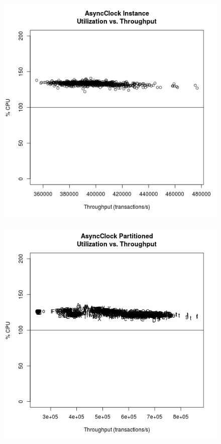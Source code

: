 \begin{figure}
\center
\includegraphics[height=.25\textheight]{async_instance_throughput_utilization.png}
\caption{\label{async_instance_throughput_utilization}}
\end{figure}

\begin{figure}
\center
\includegraphics[height=.25\textheight]{async_partitioned_throughput_utilization.png}
\caption{\label{async_partitioned_throughput_utilization}}
\end{figure}

